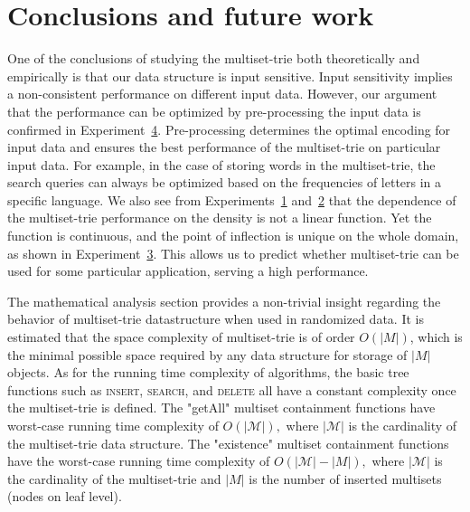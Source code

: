 \section{Conclusions and future work} \label{c:conclusions}

%
One of the conclusions of studying the multiset-trie both theoretically and empirically is that our data structure is input sensitive. Input sensitivity implies a non-consistent performance on different input data. However, our argument that the performance can be optimized by pre-processing the input data is confirmed in  Experiment~\hyperref[ss:exp3]{4}. Pre-processing determines the optimal encoding for input data and ensures the best performance of the multiset-trie on particular input data. For example, in the case of storing words in the multiset-trie, the search queries can always be optimized based on the frequencies of letters in a specific language. We also see from Experiments~\hyperref[s:exp1]{1} and~\hyperref[s:exp2]{2} that the dependence of the multiset-trie performance on the density is not a linear function. Yet the function is continuous, and the point of inflection is unique on the whole domain, as shown in Experiment~\hyperref[s:exp3]{3}. This allows us to predict whether multiset-trie can be used for some particular application, serving a high performance. 

%
The mathematical analysis section provides a non-trivial insight regarding the behavior of multiset-trie datastructure when used in randomized data. It is estimated that the space complexity of multiset-trie is of order $O(|M|)$, which is the minimal possible space required by any data structure for storage of $|M|$ objects. 
As for the running time complexity of algorithms, the basic tree functions such as \textsc{insert}, \textsc{search}, and \textsc{delete} all have a constant complexity once the multiset-trie is defined. The "getAll" multiset containment functions have worst-case running time complexity of $O(|\mathcal{M}|),$ where $|\mathcal{M}|$ is the cardinality of the multiset-trie data structure. The "existence" multiset containment functions have the worst-case running time complexity of $O(|\mathcal{M}| - |M|),$ where $|\mathcal{M}|$ is the cardinality of the multiset-trie and $|M|$ is the number of inserted multisets (nodes on leaf level). 


